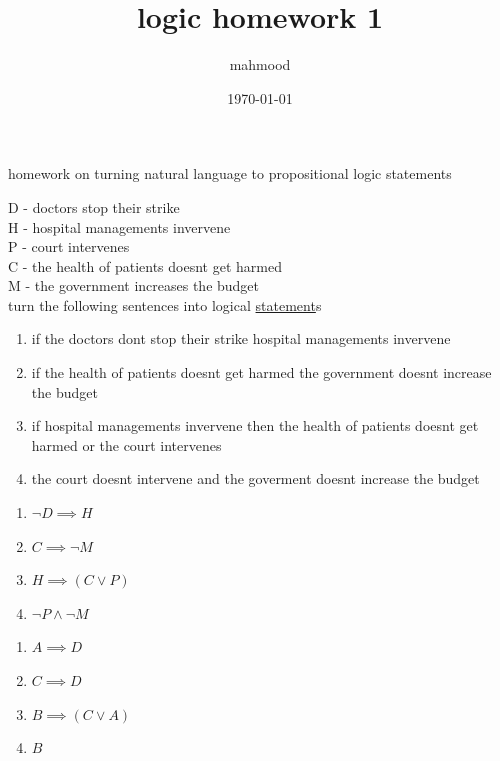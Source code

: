 \documentclass[a4paper,12pt]{article}
\author{mahmood}
\date{\today}
\title{logic homework 1}
\begin{document}
\maketitle
homework on turning natural language to propositional logic statements\\
\begin{question}
D - doctors stop their strike\\
H - hospital managements invervene\\
P - court intervenes\\
C - the health of patients doesnt get harmed\\
M - the government increases the budget\\
turn the following sentences into logical \href{20230401175139-statement.org}{statement}s\\
\begin{enumerate}
\item if the doctors dont stop their strike hospital managements invervene\\
\item if the health of patients doesnt get harmed the government doesnt increase the budget\\
\item if hospital managements invervene then the health of patients doesnt get harmed or the court intervenes\\
\item the court doesnt intervene and the goverment doesnt increase the budget\\
\end{enumerate}
\begin{answer}
\begin{enumerate}
\item \(\lnot D \implies H\)\\
\item \(C \implies \lnot M\)\\
\item \(H \implies (C \lor P)\)\\
\item \(\lnot P \land \lnot M\)\\
\end{enumerate}
\end{answer}
\end{question}

\begin{question}
\begin{answer}
\begin{enumerate}
\item \(A \implies D\)\\
\item \(C \implies D\)\\
\item \(B \implies (C \lor A)\)\\
\item \(B\)\\
\end{enumerate}
\end{answer}
\end{question}
\end{document}
